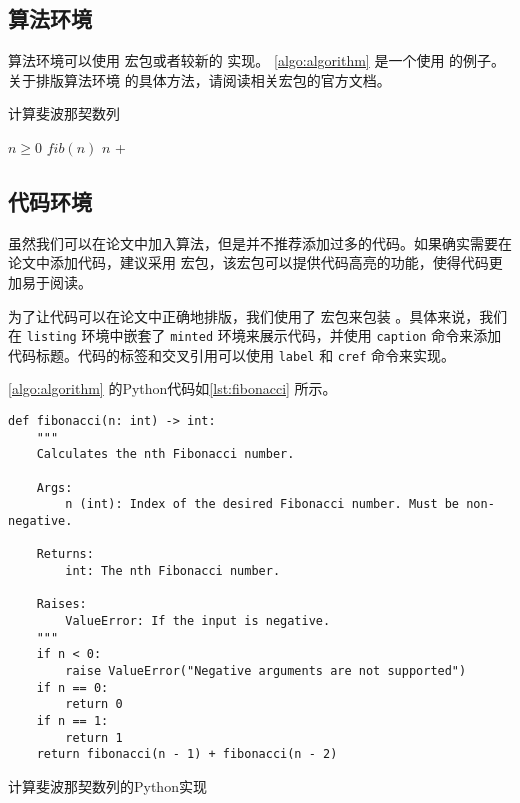 \subsection{算法环境}

算法环境可以使用  宏包或者较新的  实现。
\cref{algo:algorithm} 是一个使用  的例子。关于排版算法环境
的具体方法，请阅读相关宏包的官方文档。

\begin{algorithm}
  \caption{计算斐波那契数列}\label{algo:algorithm}
  \begin{algorithmic}[1]
    \Require $n \geq 0$
    \Ensure $fib(n)$
    \State \Return $n$
    \Else
    \State \Return {} + 
    \EndIf
    \EndFunction
  \end{algorithmic}
\end{algorithm}

\subsection{代码环境}

虽然我们可以在论文中加入算法，但是并不推荐添加过多的代码。如果确实需要在论文中添加代码，建议采用  宏包，该宏包可以提供代码高亮的功能，使得代码更加易于阅读。

为了让代码可以在论文中正确地排版，我们使用了  宏包来包装 。具体来说，我们在 \texttt{listing} 环境中嵌套了 \texttt{minted} 环境来展示代码，并使用 \texttt{caption} 命令来添加代码标题。代码的标签和交叉引用可以使用 \texttt{label} 和 \texttt{cref} 命令来实现。

\cref{algo:algorithm} 的Python代码如\cref{lst:fibonacci} 所示。



\begin{listing}[htbp]
  \begin{verbatim}
def fibonacci(n: int) -> int:
    """
    Calculates the nth Fibonacci number.

    Args:
        n (int): Index of the desired Fibonacci number. Must be non-negative.

    Returns:
        int: The nth Fibonacci number.

    Raises:
        ValueError: If the input is negative.
    """
    if n < 0:
        raise ValueError("Negative arguments are not supported")
    if n == 0:
        return 0
    if n == 1:
        return 1
    return fibonacci(n - 1) + fibonacci(n - 2)
  \end{verbatim}
  \caption{计算斐波那契数列的Python实现}\label{lst:fibonacci}
\end{listing}


